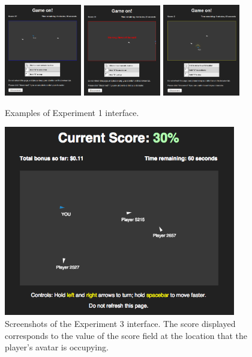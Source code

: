 \documentclass[12pt,letterpaper]{article}
\begin{document}
\begin{figure}
  \centering
  \includegraphics[width=0.3\textwidth]{./figures/experiment-3-no-score}
\includegraphics[width=0.3\textwidth]{./figures/experiment-3-wall}
  \includegraphics[width=0.3\textwidth]{./figures/experiment-3-score}
  \hspace{0.1cm}
  \caption{Examples of Experiment 1 interface.}
  \label{fig:supplemental_interface}
\end{figure}


\begin{figure}
  \centering
  \includegraphics[width=0.9\textwidth]{./figures/interface}
  \caption{Screenshots of the Experiment 3 interface.  The
    score displayed corresponds to the value of the score field at the
    location that the player's avatar is occupying.}
  \label{fig:exp3_interface}
\end{figure}
\end{document}
